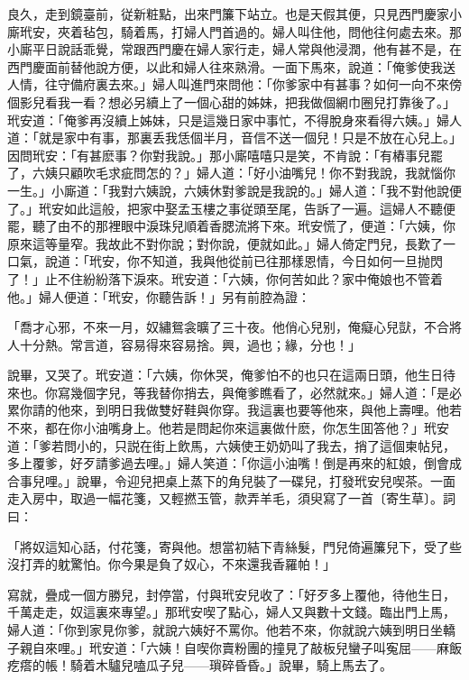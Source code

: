 良久，走到鏡臺前，従新粧點，出來門簾下站立。也是天假其便，只見西門慶家小廝玳安，夾着毡包，騎着馬，打婦人門首過的。婦人叫住他，問他往何處去來。那小廝平日說話乖覺，常跟西門慶在婦人家行走，婦人常與他浸潤，他有甚不是，在西門慶面前替他說方便，以此和婦人往來熟滑。一面下馬來，說道：「俺爹使我送人情，往守備府裏去來。」婦人叫進門來問他：「你爹家中有甚事？如何一向不來傍個影兒看我一看？想必另續上了一個心甜的姊妹，把我做個網巾圈兒打靠後了。」玳安道：「俺爹再沒續上姊妹，只是這幾日家中事忙，不得脫身來看得六姨。」婦人道：「就是家中有事，那裏丢我恁個半月，音信不送一個兒！只是不放在心兒上。」因問玳安：「有甚麽事？你對我說。」那小廝嘻嘻只是笑，不肯說：「有樁事兒罷了，六姨只顧吹毛求疵問怎的？」婦人道：「好小油嘴兒！你不對我說，我就惱你一生。」小廝道：「我對六姨說，六姨休對爹說是我說的。」婦人道：「我不對他說便了。」玳安如此這般，把家中娶孟玉樓之事従頭至尾，告訴了一遍。這婦人不聽便罷，聽了由不的那裡眼中淚珠兒順着香腮流將下來。玳安慌了，便道：「六姨，你原來這等量窄。我故此不對你說；對你說，便就如此。」婦人倚定門兒，長歎了一口氣，說道：「玳安，你不知道，我與他從前已往那樣恩情，今日如何一旦抛閃了！」止不住紛紛落下淚來。玳安道：「六姨，你何苦如此？家中俺娘也不管着他。」婦人便道：「玳安，你聽告訴！」另有前腔為證：

\begin{myquote}
「喬才心邪，不來一月，奴繡鴛衾曠了三十夜。他俏心兒别，俺癡心兒獃，不合將人十分熱。常言道，容易得來容易捨。興，過也；緣，分也！」
\end{myquote}

說畢，又哭了。玳安道：「六姨，你休哭，俺爹怕不的也只在這兩日頭，他生日待來也。你寫幾個字兒，等我替你捎去，與俺爹瞧看了，必然就來。」婦人道：「是必累你請的他來，到明日我做雙好鞋與你穿。我這裏也要等他來，與他上壽哩。他若不來，都在你小油嘴身上。他若是問起你來這裏做什麽，你怎生囬答他？」玳安道：「爹若問小的，只説在街上飲馬，六姨使王奶奶叫了我去，捎了這個柬帖兒，多上覆爹，好歹請爹過去哩。」婦人笑道：「你這小油嘴！倒是再來的紅娘，倒會成合事兒哩。」說畢，令迎兒把桌上蒸下的角兒裝了一碟兒，打發玳安兒喫茶。一面走入房中，取過一幅花箋，又輕撚玉管，款弄羊毛，須臾寫了一首〔寄生草〕。詞曰：
\begin{myquote}
「將奴這知心話，付花箋，寄與他。想當初結下青絲髮，門兒倚遍簾兒下，受了些沒打弄的躭驚怕。你今果是負了奴心，不來還我香羅帕！」
\end{myquote}

寫就，疊成一個方勝兒，封停當，付與玳安兒收了：「好歹多上覆他，待他生日，千萬走走，奴這裏來專望。」那玳安喫了點心，婦人又與數十文錢。臨出門上馬，婦人道：「你到家見你爹，就說六姨好不罵你。他若不來，你就說六姨到明日坐轎子親自來哩。」玳安道：「六姨！自喫你賣粉團的撞見了敲板兒蠻子叫寃屈——麻飯疙瘩的帳！騎着木驢兒嗑瓜子兒——瑣碎昏昏。」說畢，騎上馬去了。


